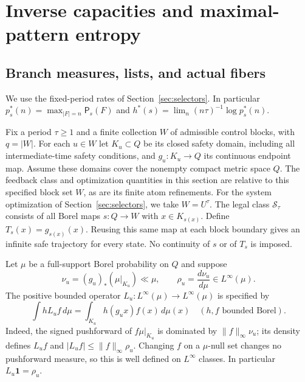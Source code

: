 \documentclass[11pt,reqno]{amsart}
\numberwithin{equation}{section}
\theoremstyle{definition}
\newcommand{\Patt}{\mathsf P}
\newcommand{\one}{\mathbf 1}
\begin{document}
\section{Inverse capacities and maximal-pattern entropy}\label{sec:capacity}

\subsection{Branch measures, lists, and actual fibers}
We use the fixed-period rates of Section~\ref{sec:selectors}.
In particular $p_s^*(n)=\max_{|F|=n}\Patt_s(F)$ and
$h^*(s)=\lim_n(n\tau)^{-1}\log p_s^*(n)$.

Fix a period $\tau\ge1$ and a finite collection $W$ of admissible
control blocks, with $q=|W|$. For each $u\in W$ let $K_u\subset Q$
be its closed safety domain, including all intermediate-time safety
conditions, and $g_u:K_u\to Q$ its continuous endpoint map.
Assume these domains cover the nonempty compact metric space $Q$.
The feedback class and optimization quantities in this section are
relative to this specified block set $W$, as are its finite atom
refinements. For the system optimization of Section~\ref{sec:selectors},
we take $W=U^\tau$.
The legal class $\mathcal S_\tau$ consists of all Borel maps
$s:Q\to W$ with $x\in K_{s(x)}$. Define
$T_s(x)=g_{s(x)}(x)$. Reusing this same map at each block boundary
gives an infinite safe trajectory for every state. No continuity of
$s$ or of $T_s$ is imposed.

Let $\mu$ be a full-support Borel probability on $Q$ and suppose
\begin{equation}\label{eq:cap-density}
 \nu_u=(g_u)_*(\mu|_{K_u})\ll\mu,\qquad
 \rho_u=\frac{d\nu_u}{d\mu}\in L^\infty(\mu).
\end{equation}
The positive bounded operator $L_u:L^\infty(\mu)\to L^\infty(\mu)$
is specified by
\begin{equation}\label{eq:cap-transfer}
 \int hL_uf\,d\mu=\int_{K_u}h(g_ux)f(x)\,d\mu(x)
 \quad(h,f\text{ bounded Borel}).
\end{equation}
Indeed, the signed pushforward of $f\mu|_{K_u}$ is dominated by
$\|f\|_\infty\nu_u$; its density defines $L_uf$ and
$|L_uf|\le\|f\|_\infty\rho_u$. Changing $f$ on a $\mu$-null
set changes no pushforward measure, so this is well defined on
$L^\infty$ classes. In particular $L_u\one=\rho_u$.
\end{document}
